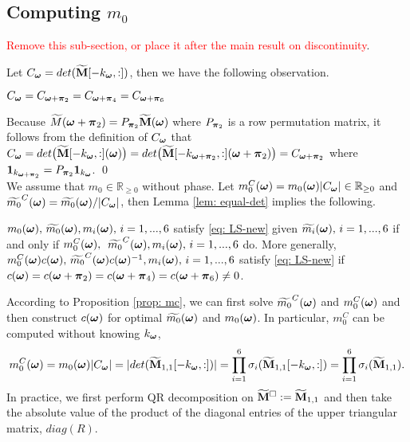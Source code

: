 \subsection{Computing $m_0$}\label{subsec: compute-m0}
\textcolor{red}{Remove this sub-section, or place it after the main result on discontinuity}.

Let $C_{\boldsymbol{\omega}} = det(\widetilde{\mathbf{M}}[-k_{\boldsymbol{\omega}},:])$, then we have the following observation.
\begin{lemma}\label{lem: equal-det}
$C_{\boldsymbol{\omega}} = C_{\boldsymbol{\omega}+\boldsymbol{\pi}_2} = C_{\boldsymbol{\omega}+\boldsymbol{\pi}_4} = C_{\boldsymbol{\omega}+\boldsymbol{\pi}_6}$
\end{lemma}
Because $\widetilde{M}(\boldsymbol{\omega}+\boldsymbol{\pi}_2) = P_{\boldsymbol{\pi}_2}\widetilde{\mathbf{M}}(\boldsymbol{\omega})$ where $P_{\boldsymbol{\pi}_2}$ is a row permutation matrix, it follows from the definition of $C_{\boldsymbol{\omega}}$ that 
$C_{\boldsymbol{\omega}} = det\big(\widetilde{\mathbf{M}}[-k_{\boldsymbol{\omega}},:](\boldsymbol{\omega})\big) = det\big(\widetilde{\mathbf{M}}[-k_{\boldsymbol{\omega}+\boldsymbol{\pi}_2},:](\boldsymbol{\omega}+\boldsymbol{\pi}_2) \big)= C_{\boldsymbol{\omega}+\boldsymbol{\pi}_2}$ where 
$\mathbf{1}_{k_{\boldsymbol{\omega}+\boldsymbol{\pi}_2}} = P_{\boldsymbol{\pi}_2}\mathbf{1}_{k_{\boldsymbol{\omega}}}$.
\qed\\[1em]
We assume that $m_0\in\mathbb{R}_{\geq 0}$ without phase. Let $m_0^C(\boldsymbol{\omega}) = m_0(\boldsymbol{\omega})|C_{\boldsymbol{\omega}}|\in \mathbb{R}_{\geq 0}$ and $\widetilde{m_{0}}^C(\boldsymbol{\omega}) = \widetilde{m_{0}}(\boldsymbol{\omega})/|C_{\boldsymbol{\omega}}|$, then Lemma \ref{lem: equal-det} implies the following.
\begin{proposition}\label{prop: mc}
$m_0(\boldsymbol{\omega}),\,\widetilde{m_{0}}(\boldsymbol{\omega}), m_i(\boldsymbol{\omega}),\,  i = 1,...,6$ satisfy \eqref{eq: LS-new} given $\widetilde{m_{i}}(\boldsymbol{\omega}),\,i=1,...,6$ if and only if $m_0^C(\boldsymbol{\omega}),$ $\,\widetilde{m_{0}}^C(\boldsymbol{\omega}), m_i(\boldsymbol{\omega}),\,i = 1,...,6$ do. More generally, $m_0^C(\boldsymbol{\omega})c(\boldsymbol{\omega}),\,\widetilde{m_{0}}^C(\boldsymbol{\omega})c(\boldsymbol{\omega})^{-1}, m_i(\boldsymbol{\omega}),\,i=1,...,6$ satisfy \eqref{eq: LS-new} if $c(\boldsymbol{\omega}) = c(\boldsymbol{\omega}+\boldsymbol{\pi}_2)=c(\boldsymbol{\omega}+\boldsymbol{\pi}_4) = c(\boldsymbol{\omega}+\boldsymbol{\pi}_6) \neq 0$.
\end{proposition}
According to Proposition \ref{prop: mc}, we can first solve $\widetilde{m_{0}}^C(\boldsymbol{\omega})$ and $m_0^C(\boldsymbol{\omega})$ and then construct $c(\boldsymbol{\omega})$ for optimal $\widetilde{m_{0}}(\boldsymbol{\omega})$ and $m_0(\boldsymbol{\omega})$. 
In particular, $m_0^C$ can be computed without knowing $k_{\boldsymbol{\omega}}$,
\begin{align}\label{eq: m0C}
m_0^C(\boldsymbol{\omega}) = m_0(\boldsymbol{\omega})|C_{\boldsymbol{\omega}}| = |det(\widetilde{\mathbf{M}}_{1,1}[-k_{\boldsymbol{\omega}},:])| = \prod_{i=1}^6\sigma_i(\widetilde{\mathbf{M}}_{1,1}[-k_{\boldsymbol{\omega}},:]) = \prod_{i=1}^6\sigma_i(\widetilde{\mathbf{M}}_{1,1}).
\end{align}
In practice, we first perform QR decomposition on $\widetilde{\mathbf{M}}^{\Box}:=\widetilde{\mathbf{M}}_{1,1}$ and then take the absolute value of the product of the diagonal entries of the upper triangular matrix, $diag(R)$. 
